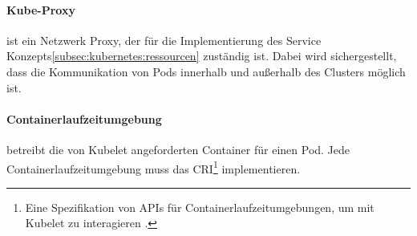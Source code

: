 \paragraph{Kube-Proxy} ist ein Netzwerk Proxy, der für die Implementierung des Service Konzepts\ref{subsec:kubernetes:ressourcen}
zuständig ist. 
Dabei wird sichergestellt, dass die Kommunikation von Pods innerhalb und außerhalb des Clusters möglich ist.
\paragraph{Containerlaufzeitumgebung} betreibt die von Kubelet angeforderten Container für einen Pod. 
Jede Containerlaufzeitumgebung muss das 
\ac{CRI}\footnote{Eine Spezifikation von APIs für Containerlaufzeitumgebungen, um mit Kubelet zu interagieren \cite{cri}.} implementieren.
